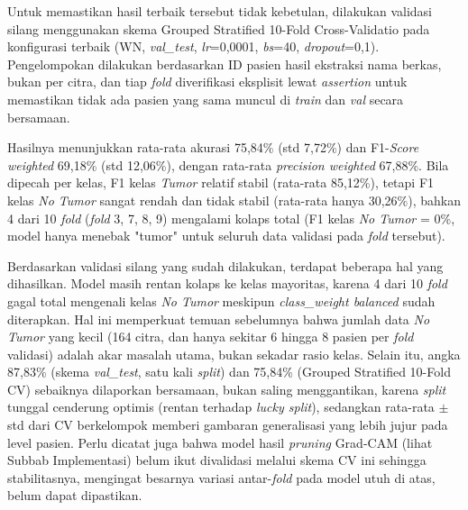 Untuk memastikan hasil terbaik tersebut tidak kebetulan, dilakukan validasi silang menggunakan skema Grouped Stratified 10-Fold Cross-Validatio pada konfigurasi terbaik (WN, \textit{val\_test}, \textit{lr}=0,0001, \textit{bs}=40, \textit{dropout}=0,1). Pengelompokan dilakukan berdasarkan ID pasien hasil ekstraksi nama berkas, bukan per citra, dan tiap \textit{fold} diverifikasi eksplisit lewat \textit{assertion} untuk memastikan tidak ada pasien yang sama muncul di \textit{train} dan \textit{val} secara bersamaan.

Hasilnya menunjukkan rata-rata akurasi 75,84\% (std 7,72\%) dan F1-\textit{Score} \textit{weighted} 69,18\% (std 12,06\%), dengan rata-rata \textit{precision weighted} 67,88\%. Bila dipecah per kelas, F1 kelas \textit{Tumor} relatif stabil (rata-rata 85,12\%), tetapi F1 kelas \textit{No Tumor} sangat rendah dan tidak stabil (rata-rata hanya 30,26\%), bahkan 4 dari 10 \textit{fold} (\textit{fold} 3, 7, 8, 9) mengalami kolaps total (F1 kelas \textit{No Tumor} = 0\%, model hanya menebak "tumor" untuk seluruh data validasi pada \textit{fold} tersebut).

Berdasarkan validasi silang yang sudah dilakukan, terdapat beberapa hal yang dihasilkan. Model masih rentan kolaps ke kelas mayoritas, karena 4 dari 10 \textit{fold} gagal total mengenali kelas \textit{No Tumor} meskipun \textit{class\_weight balanced} sudah diterapkan. Hal ini memperkuat temuan sebelumnya bahwa jumlah data \textit{No Tumor} yang kecil (164 citra, dan hanya sekitar 6 hingga 8 pasien per \textit{fold} validasi) adalah akar masalah utama, bukan sekadar rasio kelas. Selain itu, angka 87,83\% (skema \textit{val\_test}, satu kali \textit{split}) dan 75,84\% (Grouped Stratified 10-Fold CV) sebaiknya dilaporkan bersamaan, bukan saling menggantikan, karena \textit{split} tunggal cenderung optimis (rentan terhadap \textit{lucky split}), sedangkan rata-rata $\pm$ std dari CV berkelompok memberi gambaran generalisasi yang lebih jujur pada level pasien. Perlu dicatat juga bahwa model hasil \textit{pruning} Grad-CAM (lihat Subbab Implementasi) belum ikut divalidasi melalui skema CV ini sehingga stabilitasnya, mengingat besarnya variasi antar-\textit{fold} pada model utuh di atas, belum dapat dipastikan.

